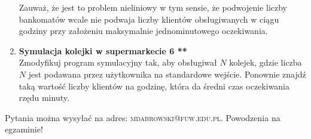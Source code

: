 \documentclass[12pt]{article}
\begin{document}
\begin{enumerate}
\vspace{0.1cm}
Zauważ, że jest to problem nieliniowy w tym sensie, że podwojenie liczby bankomatów
wcale nie podwaja liczby klientów obsługiwanych w ciągu godziny przy założeniu
maksymalnie jednominutowego oczekiwania.

\item \textbf{Symulacja kolejki w supermarkecie 6 **}\\
Zmodyfikuj program symulacyjny tak, aby obsługiwał $N$ kolejek, gdzie liczba $N$ jest podawana przez użytkownika na standardowe wejście. Ponownie
znajdź taką wartość liczby klientów na godzinę, która da średni czas oczekiwania rzędu
minuty.

\end{enumerate}
\vspace{1cm}
\small Pytania można wysyłać na adres: \textsc{mdabrowski@fuw.edu.pl}. Powodzenia na egzaminie!
\end{document}
